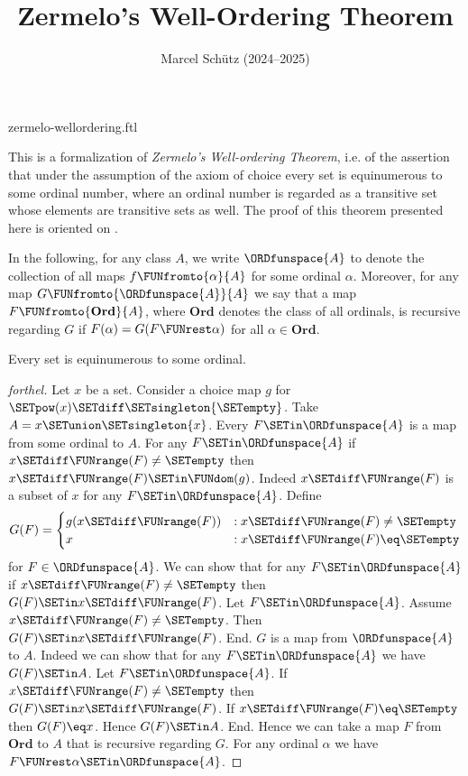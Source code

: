 \documentclass{article}
\title{Zermelo's Well-Ordering Theorem}
\author{Marcel Schütz (2024--2025)}
\date{}
\newcommand\Ord{\textbf{Ord}}
\begin{document}
\begin{smodule}{zermelo-wellordering.ftl}
\maketitle


\noindent This is a formalization of \textit{Zermelo's Well-ordering Theorem},
i.e. of the assertion that under the assumption of the axiom of choice every
set is equinumerous to some ordinal number, where an ordinal number is
regarded as a transitive set whose elements are transitive sets as well.
The proof of this theorem presented here is oriented on \cite{Koepke2018}.

In the following, for any class $A$, we write $\ORDfunspace{A}$ to
denote the collection of all maps $f \FUNfromto{\alpha}{A}$ for some ordinal
$\alpha$.
Moreover, for any map $G \FUNfromto{\ORDfunspace{A}}{A}$ we say that a map
$F \FUNfromto{\Ord}{A}$, where $\Ord$ denotes the class of all ordinals, is
recursive regarding $G$ if $F(\alpha) = G(F \FUNrest \alpha)$ for all
$\alpha \in \Ord$.

\begin{theorem}[forthel,title=Zermelo's Well-Ordering Theorem,id=zermelo]
  Every set is equinumerous to some ordinal.
\end{theorem}
\begin{proof}[forthel]
  Let $x$ be a set.
  Consider a choice map $g$ for $\SETpow(x) \SETdiff \SETsingleton{\SETempty}$.
  Take $A = x \SETunion \SETsingleton{x}$.
  Every $F \SETin \ORDfunspace{A}$ is a map from some ordinal to $A$.
  For any $F \SETin \ORDfunspace{A}$ if $x \SETdiff \FUNrange(F) \neq \SETempty$ then $x \SETdiff \FUNrange(F) \SETin \FUNdom(g)$.
  Indeed $x \SETdiff \FUNrange(F)$ is a subset of $x$ for any $F \SETin \ORDfunspace{A}$.
  Define \[ G(F) =
    \begin{cases}
      g(x \SETdiff \FUNrange(F))
      & : x \SETdiff \FUNrange(F) \neq \SETempty
      \\
      x
      & : x \SETdiff \FUNrange(F) \eq \SETempty
    \end{cases} \]
  for $F \in \ORDfunspace{A}$.
  We can show that for any $F \SETin \ORDfunspace{A}$ if $x \SETdiff \FUNrange(F) \neq \SETempty$ then $G(F) \SETin x \SETdiff \FUNrange(F)$.
    Let $F \SETin \ORDfunspace{A}$.
    Assume $x \SETdiff \FUNrange(F) \neq \SETempty$.  
    Then $G(F) \SETin x \SETdiff \FUNrange(F)$.
  End.
  $G$ is a map from $\ORDfunspace{A}$ to $A$.
  Indeed we can show that for any $F \SETin \ORDfunspace{A}$ we have $G(F) \SETin A$.
    Let $F \SETin \ORDfunspace{A}$.
    If $x \SETdiff \FUNrange(F) \neq \SETempty$ then $G(F) \SETin x \SETdiff \FUNrange(F)$.
    If $x \SETdiff \FUNrange(F) \eq \SETempty$ then $G(F) \eq x$.
    Hence $G(F) \SETin A$.
  End.
  Hence we can take a map $F$ from $\Ord$ to $A$ that is recursive regarding $G$.
  For any ordinal $\alpha$ we have $F \FUNrest \alpha \SETin \ORDfunspace{A}$.


\end{proof}
\end{smodule}
\end{document}
